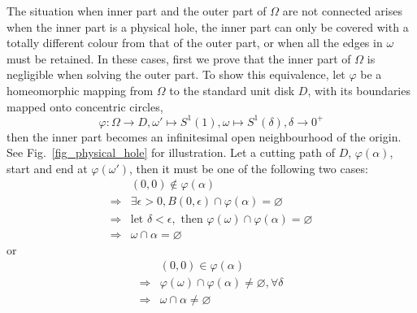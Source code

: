 \documentclass[conference]{IEEEtran}
\begin{document}
The situation when inner part and the outer part of $\Omega$ are not connected arises when the inner part is a physical hole, 
the inner part can only be covered with a totally different colour from that of the outer part, or when all the edges in $\omega$ must be retained. 
In these cases, first we prove that the inner part of $\Omega$ is negligible when solving the outer part. 
To show this equivalence, let $\varphi$ be a homeomorphic mapping%
from $\Omega$ to the standard unit disk $D$, with its boundaries mapped onto concentric circles, 
\begin{equation}
\varphi: \Omega\rightarrow D, \omega'\mapsto S^1(1), \omega\mapsto S^1(\delta), \delta\rightarrow 0^+
\end{equation}
then the inner part becomes an infinitesimal open neighbourhood of the origin. See Fig.~\ref{fig_physical_hole} for illustration. 
Let a cutting path of $D$, $\varphi(\alpha)$, start and end at $\varphi(\omega')$, then it must be one of the following two cases:
\begin{equation}
\label{equ_nocross}
\begin{aligned}
&(0, 0)\notin \varphi(\alpha)\\
\Rightarrow &\exists \epsilon > 0, B(0, \epsilon) \cap \varphi(\alpha) = \varnothing\\
\Rightarrow &\mbox{let } \delta < \epsilon, \mbox{ then } \varphi(\omega)\cap \varphi(\alpha) = \varnothing\\
\Rightarrow & \omega\cap \alpha = \varnothing
\end{aligned}
\end{equation}
or 
\begin{equation}
\label{equ_cross}
\begin{aligned}
&(0, 0)\in \varphi(\alpha)\\
\Rightarrow &\varphi(\omega)\cap \varphi(\alpha) \neq \varnothing, \forall \delta\\
\Rightarrow & \omega\cap \alpha \neq \varnothing
\end{aligned}
\end{equation}
\end{document}
